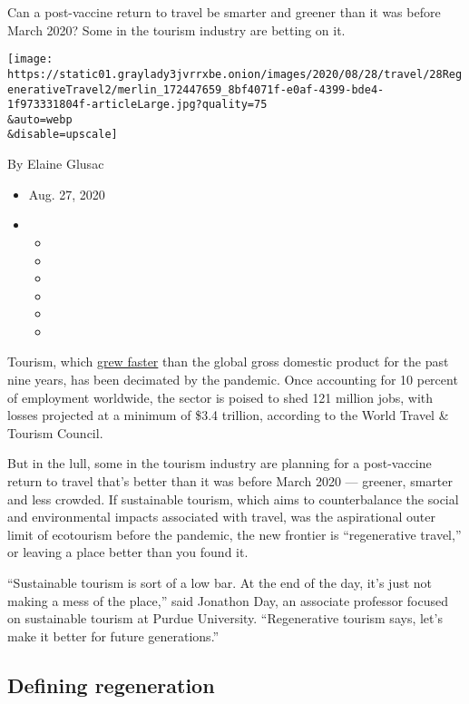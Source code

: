 Can a post-vaccine return to travel be smarter and greener than it was
before March 2020? Some in the tourism industry are betting on it.

\texttt{[image: https://static01.graylady3jvrrxbe.onion/images/2020/08/28/travel/28RegenerativeTravel2/merlin\_172447659\_8bf4071f-e0af-4399-bde4-1f973331804f-articleLarge.jpg?quality=75\\\&auto=webp\\\&disable=upscale]}

By Elaine Glusac

\begin{itemize}
\item
  Aug. 27, 2020
\item
  \begin{itemize}
  \item
  \item
  \item
  \item
  \item
  \item
  \end{itemize}
\end{itemize}

Tourism, which \href{https://wttc.org/Research/Economic-Impact}{grew
faster} than the global gross domestic product for the past nine years,
has been decimated by the pandemic. Once accounting for 10 percent of
employment worldwide, the sector is poised to shed 121 million jobs,
with losses projected at a minimum of \$3.4 trillion, according to the
World Travel \& Tourism Council.

But in the lull, some in the tourism industry are planning for a
post-vaccine return to travel that's better than it was before March
2020 --- greener, smarter and less crowded. If sustainable tourism,
which aims to counterbalance the social and environmental impacts
associated with travel, was the aspirational outer limit of ecotourism
before the pandemic, the new frontier is ``regenerative travel,'' or
leaving a place better than you found it.

``Sustainable tourism is sort of a low bar. At the end of the day, it's
just not making a mess of the place,'' said Jonathon Day, an associate
professor focused on sustainable tourism at Purdue University.
``Regenerative tourism says, let's make it better for future
generations.''

\hypertarget{defining-regeneration}{%
\subsection{Defining regeneration}\label{defining-regeneration}}

